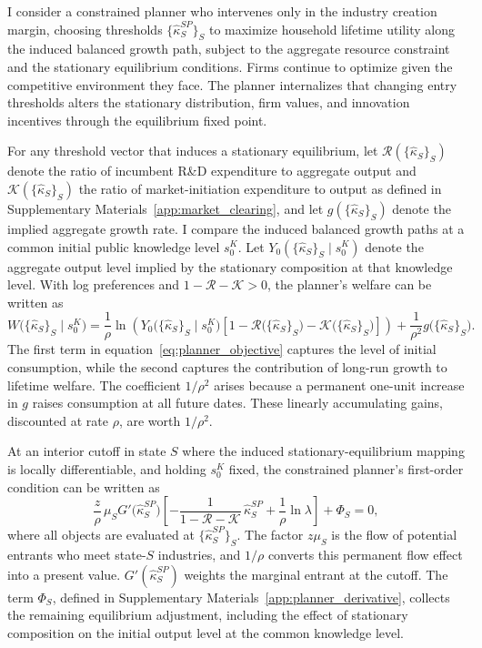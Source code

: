 \documentclass[12pt]{article}
\begin{document}
I consider a constrained planner who intervenes only in the industry creation margin, choosing thresholds \(\{\hat{\kappa}^{SP}_S\}_S\) to maximize household lifetime utility along the induced balanced growth path, subject to the aggregate resource constraint and the stationary equilibrium conditions. Firms continue to optimize given the competitive environment they face. The planner internalizes that changing entry thresholds alters the stationary distribution, firm values, and innovation incentives through the equilibrium fixed point.

For any threshold vector that induces a stationary equilibrium, let \(\mathcal{R}(\{\hat\kappa_S\}_S)\) denote the ratio of incumbent R\&D expenditure to aggregate output and \(\mathcal{K}(\{\hat\kappa_S\}_S)\) the ratio of market-initiation expenditure to output as defined in Supplementary Materials~\ref{app:market_clearing}, and let \(g(\{\hat\kappa_S\}_S)\) denote the implied aggregate growth rate. I compare the induced balanced growth paths at a common initial public knowledge level \(s^K_0\). Let \(Y_0(\{\hat\kappa_S\}_S\mid s^K_0)\) denote the aggregate output level implied by the stationary composition at that knowledge level. With log preferences and \(1-\mathcal{R}-\mathcal{K}>0\), the planner's welfare can be written as
\begin{equation}
W\bigl(\{\hat\kappa_S\}_S\mid s^K_0\bigr)=
\frac{1}{\rho}\ln\!\left(Y_0\bigl(\{\hat\kappa_S\}_S\mid s^K_0\bigr)\left[1-\mathcal{R}\bigl(\{\hat\kappa_S\}_S\bigr)-\mathcal{K}\bigl(\{\hat\kappa_S\}_S\bigr)\right]\right)+\frac{1}{\rho^2}g\bigl(\{\hat\kappa_S\}_S\bigr).\label{eq:planner_objective}
\end{equation}
The first term in equation~\eqref{eq:planner_objective} captures the level of initial consumption, while the second captures the contribution of long-run growth to lifetime welfare. The coefficient \(1/\rho^2\) arises because a permanent one-unit increase in \(g\) raises consumption at all future dates. These linearly accumulating gains, discounted at rate \(\rho\), are worth \(1/\rho^2\).

At an interior cutoff in state \(S\) where the induced stationary-equilibrium mapping is locally differentiable, and holding \(s^K_0\) fixed, the constrained planner's first-order condition can be written as
\begin{equation}
\frac{z}{\rho}\,\mu_S G'\bigl(\hat\kappa^{SP}_S\bigr)
\left[
  -\frac{1}{1 - \mathcal{R} - \mathcal{K}}\,\hat\kappa^{SP}_S
  + \frac{1}{\rho}\ln\lambda
\right]
+ \Phi_S = 0,
\label{eq:planner_FOC}
\end{equation}
where all objects are evaluated at \(\{\hat\kappa^{SP}_S\}_S\). The factor \(z\mu_S\) is the flow of potential entrants who meet state-\(S\) industries, and \(1/\rho\) converts this permanent flow effect into a present value. \(G'(\hat\kappa^{SP}_S)\) weights the marginal entrant at the cutoff. The term \(\Phi_S\), defined in Supplementary Materials~\ref{app:planner_derivative}, collects the remaining equilibrium adjustment, including the effect of stationary composition on the initial output level at the common knowledge level.
\end{document}
